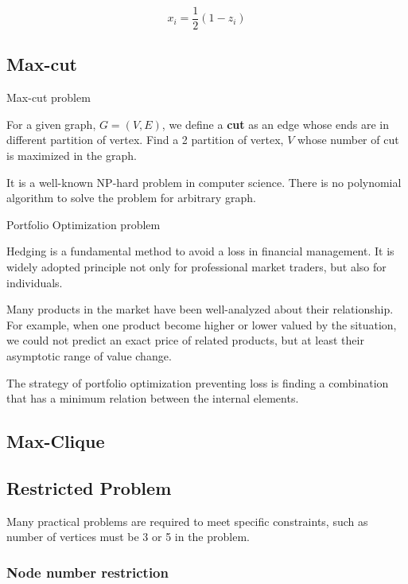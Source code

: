 \begin{equation}
x_i = \frac{1}{2}(1-z_i)
\end{equation}

\subsection{Max-cut}

\begin{definition}Max-cut problem

    For a given graph, $G=(V,E)$, we define a \textbf{cut} as an edge whose ends are in different partition of vertex.
    Find a 2 partition of vertex, $V$ whose number of cut is maximized in the graph.
\end{definition}


It is a well-known NP-hard problem in computer science. 
There is no polynomial algorithm to solve the problem for arbitrary graph.

\begin{example} Portfolio Optimization problem

    Hedging is a fundamental method to avoid a loss in financial management.
    It is widely adopted principle not only for professional market traders,
    but also for individuals.
    
    Many products in the market have been well-analyzed about their 
    relationship. For example, when one product become higher or lower valued 
    by the situation, we could not predict an exact price of related products,
    but at least their asymptotic range of value change.

    The strategy of portfolio optimization preventing loss is finding 
    a combination that has a minimum relation between the internal elements.
    
\end{example}
\subsection{Max-Clique}

\subsection{Restricted Problem}

Many practical problems are required to meet specific constraints,
such as number of vertices must be 3 or 5 in the problem.

\subsubsection{Node number restriction}

